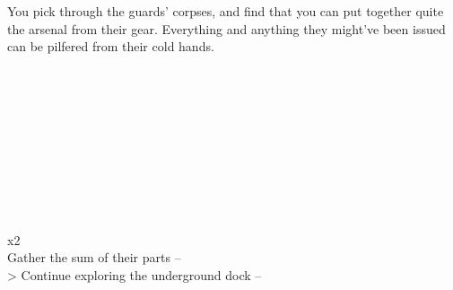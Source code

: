 You pick through the guards’ corpses, and find that you can put together quite the arsenal from their gear. Everything and anything they might’ve been issued can be pilfered from their cold hands.\\
\\
\\
\\
\\
\\
\\
\\
\\
\\
\\
 x2\\

 Gather the sum of their parts -- \\
> Continue exploring the underground dock -- 
